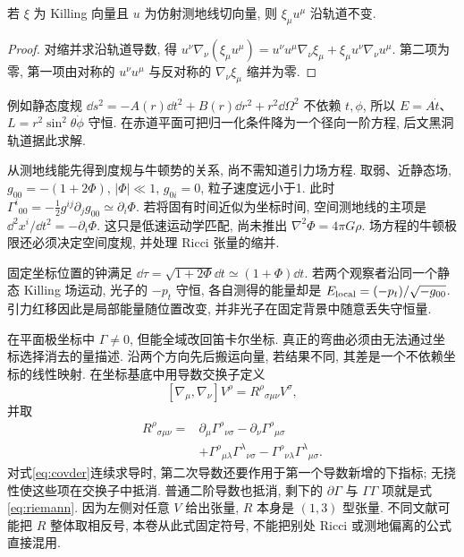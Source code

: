 \begin{proposition}\label{prop:geodesic-killing}
若 $\xi$ 为 Killing 向量且 $u$ 为仿射测地线切向量, 则 $\xi_\mu u^\mu$ 沿轨道不变.
\end{proposition}
\begin{proof}
对缩并求沿轨道导数, 得 $u^\nu\nabla_\nu(\xi_\mu u^\mu)=u^\nu u^\mu\nabla_\nu\xi_\mu+\xi_\mu u^\nu\nabla_\nu u^\mu$. 第二项为零, 第一项由对称的 $u^\nu u^\mu$ 与反对称的 $\nabla_\nu\xi_\mu$ 缩并为零.
\end{proof}
例如静态度规 $\dd s^2=-A(r)\dd t^2+B(r)\dd r^2+r^2\dd\Omega^2$ 不依赖 $t,\phi$, 所以 $E=A\dot t$、$L=r^2\sin^2\theta\dot\phi$ 守恒. 在赤道平面可把归一化条件降为一个径向一阶方程, 后文黑洞轨道据此求解.

从测地线能先得到度规与牛顿势的关系, 尚不需知道引力场方程. 取弱、近静态场, $g_{00}=-(1+2\Phi)$, $|\Phi|\ll1$, $g_{0i}=0$, 粒子速度远小于1. 此时 $\Gamma^i{}_{00}= -\frac12g^{ij}\partial_jg_{00}\simeq\partial_i\Phi$. 若将固有时间近似为坐标时间, 空间测地线的主项是
$\dd^2x^i/\dd t^2=-\partial_i\Phi$.
这只是低速运动学匹配, 尚未推出 $\nabla^2\Phi=4\pi G\rho$. 场方程的牛顿极限还必须决定空间度规, 并处理 Ricci 张量的缩并.

固定坐标位置的钟满足 $\dd\tau=\sqrt{1+2\Phi}\dd t\simeq(1+\Phi)\dd t$. 若两个观察者沿同一个静态 Killing 场运动, 光子的 $-p_t$ 守恒, 各自测得的能量却是 $E_{\rm local}=(-p_t)/\sqrt{-g_{00}}$. 引力红移因此是局部能量随位置改变, 并非光子在固定背景中随意丢失守恒量.

在平面极坐标中 $\Gamma\ne0$, 但能全域改回笛卡尔坐标. 真正的弯曲必须由无法通过坐标选择消去的量描述. 沿两个方向先后搬运向量, 若结果不同, 其差是一个不依赖坐标的线性映射. 在坐标基底中用导数交换子定义
\begin{equation}\label{eq:curvature-convention}
[\nabla_\mu,\nabla_\nu]V^\rho
=R^\rho{}_{\sigma\mu\nu}V^\sigma,
\end{equation}
并取
\begin{equation}\label{eq:riemann}
\begin{split}
R^\rho{}_{\sigma\mu\nu}={}&\partial_\mu\Gamma^\rho{}_{\nu\sigma}
-\partial_\nu\Gamma^\rho{}_{\mu\sigma}\\
&+\Gamma^\rho{}_{\mu\lambda}\Gamma^\lambda{}_{\nu\sigma}
-\Gamma^\rho{}_{\nu\lambda}\Gamma^\lambda{}_{\mu\sigma}.
\end{split}
\end{equation}
对式\eqref{eq:covder}连续求导时, 第二次导数还要作用于第一个导数新增的下指标; 无挠性使这些项在交换子中抵消. 普通二阶导数也抵消, 剩下的 $\partial\Gamma$ 与 $\Gamma\Gamma$ 项就是式\eqref{eq:riemann}. 因为左侧对任意 $V$ 给出张量, $R$ 本身是 $(1,3)$ 型张量. 不同文献可能把 $R$ 整体取相反号, 本卷从此式固定符号, 不能把别处 Ricci 或测地偏离的公式直接混用.

